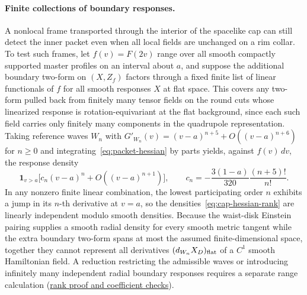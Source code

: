 \documentclass[10pt,a4paper]{article}
\numberwithin{equation}{section}
\newcommand{\repo}[2]{\href{https://github.com/sprajs/quantum-gravity/blob/main/#1}{#2}}
\begin{document}
\paragraph{Finite collections of boundary responses.}
A nonlocal frame transported through the interior of the spacelike cap can still detect the inner packet even when all local fields are unchanged on a rim collar. To test such frames, let $f(v)=F(2v)$ range over all smooth compactly supported master profiles on an interval about $a$, and suppose the additional boundary two-form on $(X,Z_f)$ factors through a fixed finite list of linear functionals of $f$ for all smooth responses $X$ at flat space. This covers any two-form pulled back from finitely many tensor fields on the round cuts whose linearized response is rotation-equivariant at the flat background, since each such field carries only finitely many components in the quadrupole representation. Taking reference waves $W_n$ with $G'_{W_n}(v)=(v-a)^{n+5}+O((v-a)^{n+6})$ for $n\ge0$ and integrating~\eqref{eq:packet-hessian} by parts yields, against $f(v)\,dv$, the response density
\begin{equation}
 \mathbf1_{v>a}\big[c_n(v-a)^n+O((v-a)^{n+1})\big],\qquad
 c_n=-\frac{3(1-a)}{320}\frac{(n+5)!}{n!}.
 \label{eq:cap-hessian-rank}
\end{equation}
In any nonzero finite linear combination, the lowest participating order $n$ exhibits a jump in its $n$-th derivative at $v=a$, so the densities~\eqref{eq:cap-hessian-rank} are linearly independent modulo smooth densities. Because the waist-disk Einstein pairing supplies a smooth radial density for every smooth metric tangent while the extra boundary two-form spans at most the assumed finite-dimensional space, together they cannot represent all derivatives $(d_{W_n}X_D)_{\rm flat}$ of a $C^1$ smooth Hamiltonian field. A reduction restricting the admissible waves or introducing infinitely many independent radial boundary responses requires a separate range calculation (\repo{audit/match-packets.md}{rank proof and coefficient checks}).
\end{document}
